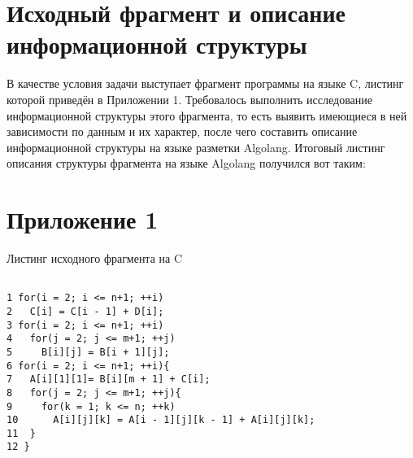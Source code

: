 \documentclass[a4paper,12pt,oneside,openleft]{memoir}
\begin{document}
	
\section{Исходный фрагмент и описание информационной структуры} 
В качестве условия задачи выступает фрагмент программы на языке C, листинг которой приведён
в Приложении 1. Требовалось выполнить исследование информационной структуры этого
фрагмента, то есть выявить имеющиеся в ней зависимости по данным и их характер, после чего
составить описание информационной структуры на языке разметки Algolang. Итоговый листинг
описания структуры фрагмента на языке Algolang получился вот таким:

\section{Приложение 1}
Листинг исходного фрагмента на C


\begin{verbatim}

1 for(i = 2; i <= n+1; ++i)
2   C[i] = C[i - 1] + D[i];
3 for(i = 2; i <= n+1; ++i)
4   for(j = 2; j <= m+1; ++j)
5     B[i][j] = B[i + 1][j];
6 for(i = 2; i <= n+1; ++i){
7   A[i][1][1]= B[i][m + 1] + C[i];
8   for(j = 2; j <= m+1; ++j){
9 	  for(k = 1; k <= n; ++k)
10 	    A[i][j][k] = A[i - 1][j][k - 1] + A[i][j][k];
11 	}
12 }
\end{verbatim}



     	
\end{document}
